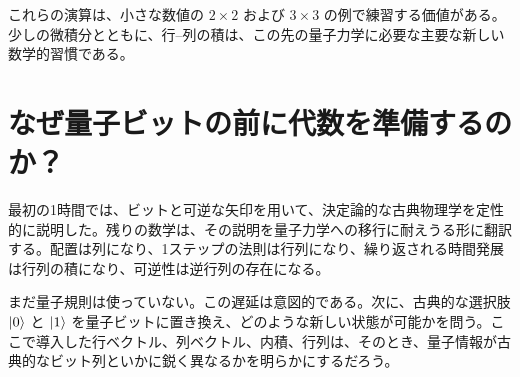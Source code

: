 これらの演算は、小さな数値の \(2\times2\) および \(3\times3\) の例で練習する価値がある。少しの微積分とともに、行--列の積は、この先の量子力学に必要な主要な新しい数学的習慣である。

\begin{classroomqa}
\end{classroomqa}

\section{なぜ量子ビットの前に代数を準備するのか？}

最初の1時間では、ビットと可逆な矢印を用いて、決定論的な古典物理学を定性的に説明した。残りの数学は、その説明を量子力学への移行に耐えうる形に翻訳する。配置は列になり、1ステップの法則は行列になり、繰り返される時間発展は行列の積になり、可逆性は逆行列の存在になる。

まだ量子規則は使っていない。この遅延は意図的である。次に、古典的な選択肢 \(\left\lvert0\right\rangle\) と \(\left\lvert1\right\rangle\) を量子ビットに置き換え、どのような新しい状態が可能かを問う。ここで導入した行ベクトル、列ベクトル、内積、行列は、そのとき、量子情報が古典的なビット列といかに鋭く異なるかを明らかにするだろう。

\begin{classroomqa}
\end{classroomqa}